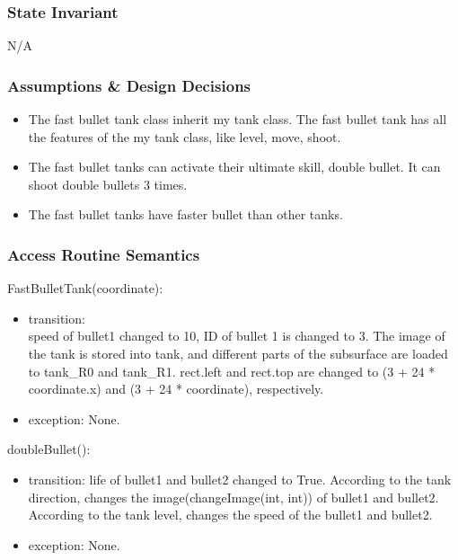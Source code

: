 \documentclass[12pt, titlepage]{article}
\begin{document}
		\subsubsection{State Invariant}
		N/A
		
		\subsubsection{Assumptions \& Design Decisions}
		\begin{itemize}
		\item The fast bullet tank class inherit my tank class. The fast bullet tank has all the features of the my tank class, like level, move, shoot.
		
		\item The fast bullet tanks can activate their ultimate skill, double bullet. It can shoot double bullets 3 times.
		
		\item The fast bullet tanks have faster bullet than other tanks.
		\end{itemize}
		
		\subsubsection{Access Routine Semantics}
		FastBulletTank(coordinate):
		\begin{itemize}
		\item transition: \\speed of bullet1 changed to 10, ID of bullet 1 is changed to 3. The image of the tank is stored into tank, and different parts of the subsurface are loaded to tank\_R0 and tank\_R1. rect.left and rect.top are changed to (3 + 24 * coordinate.x) and (3 + 24 * coordinate), respectively.
		
		\item exception: None.
        \end{itemize}
        
        doubleBullet():
		\begin{itemize}
		\item transition: life of bullet1  and bullet2 changed to True. According to the tank direction,  changes the image(changeImage(int, int)) of bullet1 and bullet2. According to the tank level, changes the speed of the bullet1 and bullet2.
		
		\item exception: None.
        \end{itemize}
\end{document}
